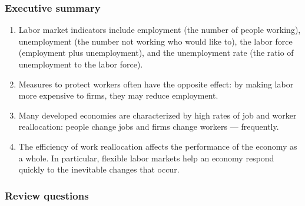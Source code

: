 \documentclass[letterpaper,12pt]{article}
\begin{document}
\subsubsection*{Executive summary}

\begin{enumerate}
\item Labor market indicators include employment (the number of
people working), unemployment (the number not working who would
like to), the labor force (employment plus unemployment), and the
unemployment rate (the ratio of unemployment to the labor force).

\item Measures to protect workers often have the opposite effect:
by making labor more expensive to firms, they may reduce employment.

\item Many developed economies are characterized by high rates of job
and worker reallocation: people change jobs and firms change
workers --- frequently.

\item The efficiency of work reallocation affects the performance
of the economy as a whole. In particular, flexible labor markets help an economy respond quickly to the inevitable changes that occur.


\end{enumerate}

\subsubsection*{Review questions}
\end{document}
